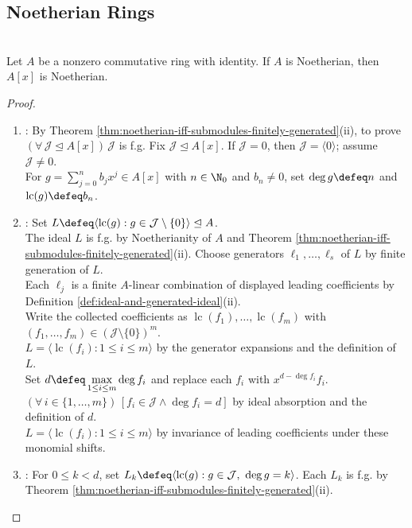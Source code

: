 \subsection{Noetherian Rings}

\begin{theorem} \label{thm:hilbert-basis-theorem} \\
Let $A$ be a nonzero commutative ring with identity. If $A$ is Noetherian, then $A[x]$ is Noetherian.
\begin{proof}
\begin{enumerate}[label=(\roman*)]
\setlength{\itemsep}{0pt}
\item {}: By Theorem \ref{thm:noetherian-iff-submodules-finitely-generated}(ii), to prove $(\forall\,\mathcal{J}\trianglelefteq A[x])\,\mathcal{J}$ is f.g. Fix $\mathcal{J}\trianglelefteq A[x]$. If $\mathcal{J}=0$, then $\mathcal{J}=\langle0\rangle$; assume $\mathcal{J}\neq0$.\\
For $g=\sum\limits_{j=0}^{n}b_jx^j\in A[x]$ with $n\in\N_0$ and $b_n\neq0$, set $\deg g\defeq n$ and $\operatorname{lc}(g)\defeq b_n$.
\item {}: Set $L\defeq\langle\operatorname{lc}(g):g\in\mathcal{J}\setminus\{0\}\rangle\trianglelefteq A$.\\
The ideal $L$ is f.g. by Noetherianity of $A$ and Theorem \ref{thm:noetherian-iff-submodules-finitely-generated}(ii). Choose generators $\ell_1,\ldots,\ell_s$ of $L$ by finite generation of $L$.\\
Each $\ell_j$ is a finite $A$-linear combination of displayed leading coefficients by Definition \ref{def:ideal-and-generated-ideal}(ii).\\
Write the collected coefficients as $\operatorname{lc}(f_1),\ldots,\operatorname{lc}(f_m)$ with $(f_1,\ldots,f_m)\in(\mathcal{J}\setminus\{0\})^m$.\\
$L=\langle\operatorname{lc}(f_i):1\leq i\leq m\rangle$ by the generator expansions and the definition of $L$.\\
Set $d\defeq\max\limits_{1\leq i\leq m}\deg f_i$ and replace each $f_i$ with $x^{d-\deg f_i}f_i$.\\
$(\forall\,i\in\{1,\ldots,m\})\,[f_i\in\mathcal{J}\land\deg f_i=d]$ by ideal absorption and the definition of $d$.\\
$L=\langle\operatorname{lc}(f_i):1\leq i\leq m\rangle$ by invariance of leading coefficients under these monomial shifts.
\item {}: For $0\leq k<d$, set $L_k\defeq\langle\operatorname{lc}(g):g\in\mathcal{J},\ \deg g=k\rangle$. Each $L_k$ is f.g. by Theorem \ref{thm:noetherian-iff-submodules-finitely-generated}(ii).\\

\end{enumerate}
\end{proof}
\end{theorem}

